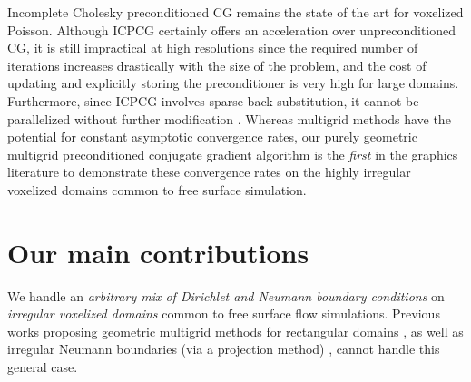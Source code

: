 Incomplete Cholesky preconditioned CG remains the state of the art for voxelized Poisson.
Although ICPCG certainly offers an acceleration over unpreconditioned CG, it is still impractical at high resolutions since the required number of iterations increases drastically with the size of the problem, and the cost of updating and explicitly storing the preconditioner %
is very high for large domains.  Furthermore, since ICPCG involves sparse back-substitution, it cannot be parallelized without further modification \cite{Hughes:2007:physicalsimulation}.
Whereas multigrid methods have the potential for constant asymptotic convergence rates, our purely geometric multigrid preconditioned conjugate gradient algorithm is the \emph{first} in the graphics literature to demonstrate these convergence rates on the highly irregular voxelized domains common to free surface simulation.

\section*{Our main contributions}


We handle an \emph{arbitrary mix of Dirichlet and Neumann boundary conditions} on \emph{irregular voxelized domains} common to free surface flow simulations. Previous works proposing geometric multigrid methods for rectangular domains \cite{TO94,AF96,BWR05,BWK06,KH08}, as well as irregular Neumann boundaries (via a projection method) \cite{MCPN08}, cannot handle this general case.  

